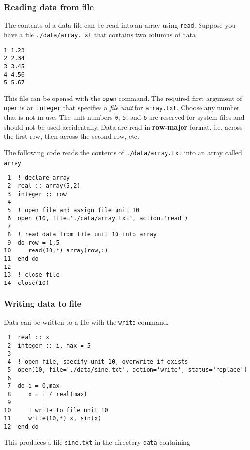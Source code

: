\documentclass[11pt]{article}
\begin{document}
\subsubsection{Reading data from file}
\label{sec:orgheadline35}
The contents of a data file can be read into an array using \texttt{read}. Suppose you have a file \texttt{./data/array.txt} that contains two columns of data

\begin{verbatim}
1 1.23
2 2.34
3 3.45
4 4.56
5 5.67
\end{verbatim}

This file can be opened with the \texttt{open} command. The required first argument of \texttt{open} is an \texttt{integer} that specifies a \emph{file unit} for \texttt{array.txt}. Choose any number that is not in use. The unit numbers \texttt{0}, \texttt{5}, and \texttt{6} are reserved for system files and should not be used accidentally. Data are read in \textbf{row-major} format, i.e. across the first row, then across the second row, etc.

The following code reads the contents of \texttt{./data/array.txt} into an array called \texttt{array}.

\begin{verbatim}
 1  ! declare array
 2  real :: array(5,2)
 3  integer :: row
 4  
 5  ! open file and assign file unit 10
 6  open (10, file='./data/array.txt', action='read')
 7  
 8  ! read data from file unit 10 into array
 9  do row = 1,5
10     read(10,*) array(row,:)
11  end do
12  
13  ! close file
14  close(10)
\end{verbatim}

\subsubsection{Writing data to file}
\label{sec:orgheadline36}
Data can be written to a file with the \texttt{write} command.

\begin{verbatim}
 1  real :: x
 2  integer :: i, max = 5
 3  
 4  ! open file, specify unit 10, overwrite if exists
 5  open(10, file='./data/sine.txt', action='write', status='replace')
 6  
 7  do i = 0,max
 8     x = i / real(max)
 9  
10     ! write to file unit 10
11     write(10,*) x, sin(x)
12  end do
\end{verbatim}

This produces a file \texttt{sine.txt} in the directory \texttt{data} containing
\end{document}
